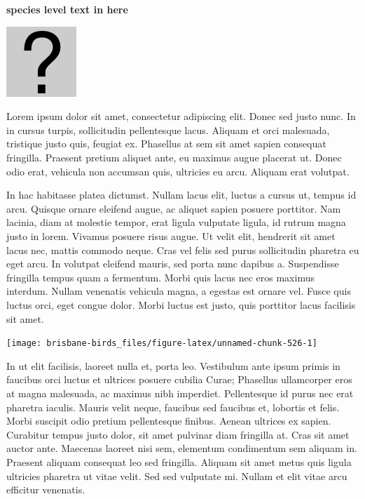 \documentclass[]{book}
\let\origfigure\figure
\let\endorigfigure\endfigure
\renewenvironment{figure}[1][2] {
  \expandafter\origfigure\expandafter[H]
} {
  \endorigfigure
}
\begin{document}
\textbf{species level text in here}

\begin{figure}
\centering
\includegraphics{assets/missing.png}
\caption{No image for species}
\end{figure}

Lorem ipsum dolor sit amet, consectetur adipiscing elit. Donec sed justo
nunc. In in cursus turpis, sollicitudin pellentesque lacus. Aliquam et
orci malesuada, tristique justo quis, feugiat ex. Phasellus at sem sit
amet sapien consequat fringilla. Praesent pretium aliquet ante, eu
maximus augue placerat ut. Donec odio erat, vehicula non accumsan quis,
ultricies eu arcu. Aliquam erat volutpat.

In hac habitasse platea dictumst. Nullam lacus elit, luctus a cursus ut,
tempus id arcu. Quisque ornare eleifend augue, ac aliquet sapien posuere
porttitor. Nam lacinia, diam at molestie tempor, erat ligula vulputate
ligula, id rutrum magna justo in lorem. Vivamus posuere risus augue. Ut
velit elit, hendrerit sit amet lacus nec, mattis commodo neque. Cras vel
felis sed purus sollicitudin pharetra eu eget arcu. In volutpat eleifend
mauris, sed porta nunc dapibus a. Suspendisse fringilla tempus quam a
fermentum. Morbi quis lacus nec eros maximus interdum. Nullam venenatis
vehicula magna, a egestas est ornare vel. Fusce quis luctus orci, eget
congue dolor. Morbi luctus est justo, quis porttitor lacus facilisis sit
amet.

\begin{figure}
\texttt{[image: brisbane-birds\_files/figure-latex/unnamed-chunk-526-1]} \caption{insert figure caption}\label{fig:unnamed-chunk-526}
\end{figure}

In ut elit facilisis, laoreet nulla et, porta leo. Vestibulum ante ipsum
primis in faucibus orci luctus et ultrices posuere cubilia Curae;
Phasellus ullamcorper eros at magna malesuada, ac maximus nibh
imperdiet. Pellentesque id purus nec erat pharetra iaculis. Mauris velit
neque, faucibus sed faucibus et, lobortis et felis. Morbi suscipit odio
pretium pellentesque finibus. Aenean ultrices ex sapien. Curabitur
tempus justo dolor, sit amet pulvinar diam fringilla at. Cras sit amet
auctor ante. Maecenas laoreet nisi sem, elementum condimentum sem
aliquam in. Praesent aliquam consequat leo sed fringilla. Aliquam sit
amet metus quis ligula ultricies pharetra ut vitae velit. Sed sed
vulputate mi. Nullam et elit vitae arcu efficitur venenatis.
\end{document}
